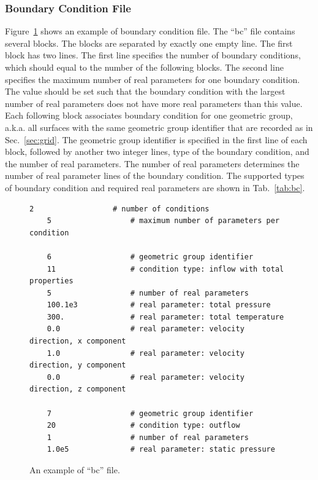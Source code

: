 \documentclass[]{article}
\begin{document}
\subsubsection{Boundary Condition File}

Figure~\ref{lst:bc} shows an example of boundary condition file.
The ``bc'' file contains several blocks.
The blocks are separated by exactly one empty line.
The first block has two lines.
The first line specifies the number of boundary conditions, which should equal to the number of the
following blocks.
The second line specifies the maximum number of real parameters for one boundary condition.
The value should be set such that the boundary condition with the largest number of real parameters
does not have more real parameters than this value.
Each following block associates boundary condition for one geometric group, a.k.a. all surfaces with
the same geometric group identifier that are recorded as in Sec.~\ref{sec:grid}.
The geometric group identifier is specified in the first line of each block, followed by another two
integer lines, type of the boundary condition, and the number of real parameters.
The number of real parameters determines the number of real parameter lines of the boundary
condition.
The supported types of boundary condition and required real parameters are shown in
Tab.~\ref{tab:bc}.

\begin{figure}[h!]
  \begin{lstlisting}[backgroundcolor=\color{lightgray}]
    2                  # number of conditions
    5                  # maximum number of parameters per condition
    
    6                  # geometric group identifier
    11                 # condition type: inflow with total properties
    5                  # number of real parameters
    100.1e3            # real parameter: total pressure
    300.               # real parameter: total temperature
    0.0                # real parameter: velocity direction, x component
    1.0                # real parameter: velocity direction, y component
    0.0                # real parameter: velocity direction, z component
    
    7                  # geometric group identifier
    20                 # condition type: outflow
    1                  # number of real parameters
    1.0e5              # real parameter: static pressure
  \end{lstlisting}
  \caption{An example of ``bc'' file.}
  \label{lst:bc}
\end{figure}
\end{document}

